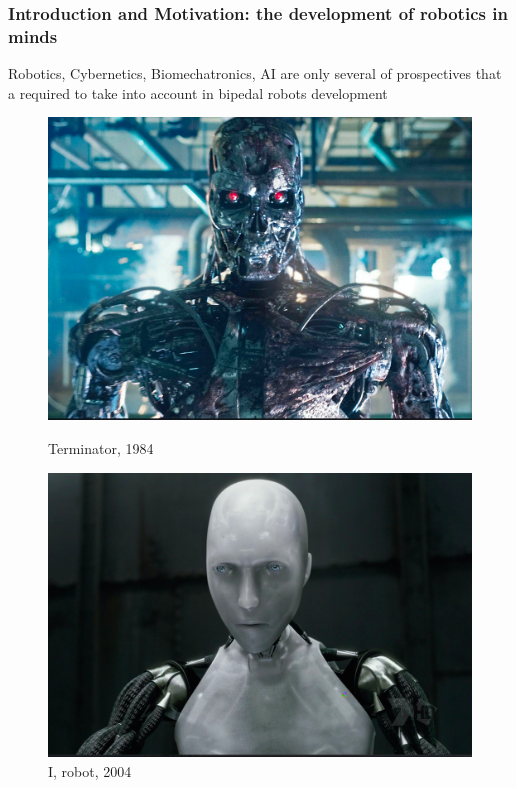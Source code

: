 \documentclass{beamer}
\begin{document}

	\begin{frame}
		\frametitle{Introduction and Motivation: the development of robotics in minds}
		\centering
		Robotics, Cybernetics, Biomechatronics, AI are only several of prospectives that a required to take into account in bipedal robots development
		
		\begin{figure}[h!]
			\begin{minipage}[H]{0.4\linewidth}
				\includegraphics[width=\linewidth]{presentation_images/3}
				\caption{Terminator, 1984}
			\end{minipage}
			\hfill
			\begin{minipage}[H]{0.4\linewidth}
				\includegraphics[width=\linewidth]{presentation_images/5}
				\caption{I, robot, 2004}
			\end{minipage}
		\end{figure}
	\end{frame}
\end{document}
